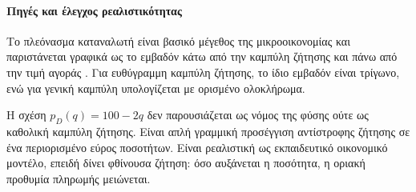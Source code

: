 \paragraph{Πηγές και έλεγχος ρεαλιστικότητας}
Το πλεόνασμα καταναλωτή είναι βασικό μέγεθος της μικροοικονομίας και
παριστάνεται γραφικά ως το εμβαδόν κάτω από την καμπύλη ζήτησης και
πάνω από την τιμή αγοράς \cite{consumerSurplusEconomic}. Για ευθύγραμμη
καμπύλη ζήτησης, το ίδιο εμβαδόν είναι τρίγωνο, ενώ για γενική καμπύλη
υπολογίζεται με ορισμένο ολοκλήρωμα.

Η σχέση \(p_D(q)=100-2q\) δεν παρουσιάζεται ως νόμος της φύσης ούτε ως
καθολική καμπύλη ζήτησης. Είναι απλή γραμμική προσέγγιση αντίστροφης
ζήτησης σε ένα περιορισμένο εύρος ποσοτήτων. Είναι ρεαλιστική ως
εκπαιδευτικό οικονομικό μοντέλο, επειδή δίνει φθίνουσα ζήτηση:
όσο αυξάνεται η ποσότητα, η οριακή προθυμία πληρωμής μειώνεται.
